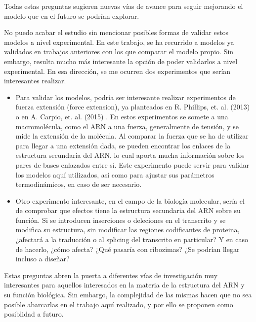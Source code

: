 \documentclass[a4paper,11pt,titlepage]{article}
\theoremstyle{definition}
\begin{document}
Todas estas preguntas sugieren nuevas vías de avance para seguir mejorando el modelo que en el futuro se podrían explorar.

No puedo acabar el estudio sin mencionar posibles formas de validar estos modelos a nivel experimental. En este trabajo, se ha recurrido a modelos ya validados en trabajos anteriores con los que comparar el modelo propio. Sin embargo, resulta mucho más interesante la opción de poder validarlos a nivel experimental. En esa dirección, se me ocurren dos experimentos que serían interesantes realizar.

\begin{itemize}
    \item Para validar los modelos, podría ser interesante realizar experimentos de fuerza extensión (force extension), ya planteados en R. Phillips, et. al. (2013) \cite{phillips} o en A. Carpio, et. al. (2015) \cite{bonilla}. En estos experimentos se somete a una macromolécula, como el ARN a una fuerza, generalmente de tensión, y se mide la extensión de la molécula. Al comparar la fuerza que se ha de utilizar para llegar a una extensión dada, se pueden encontrar los enlaces de la estructura secundaria del ARN, lo cual aporta mucha información sobre los pares de bases enlazados entre sí. Este experimento puede servir para validar los modelos aquí utilizados, así como para ajustar sus parámetros termodinámicos, en caso de ser necesario.
    \item Otro experimento interesante, en el campo de la biología molecular, sería el de comprobar que efectos tiene la estructura secundaria del ARN sobre su función. Si se introducen inserciones o deleciones en el transcrito y se modifica su estructura, sin modificar las regiones codificantes de proteina, ¿afectará a la traducción o al splicing del transcrito en particular? Y en caso de hacerlo, ¿cómo afecta? ¿Qué pasaría con ribozimas? ¿Se podrían llegar incluso a diseñar?
\end{itemize}

Estas preguntas abren la puerta a diferentes vías de investigación muy interesantes para aquellos interesados en la materia de la estructura del ARN y su función biológica. Sin embargo, la complejidad de las mismas hacen que no sea posible abarcarlas en el trabajo aquí realizado, y por ello se proponen como posiblidad a futuro.


\newpage
\newpage
\printbibliography[title=Bibliografía, heading=bibnumbered]\label{sec:refs}

\newpage
\end{document}
